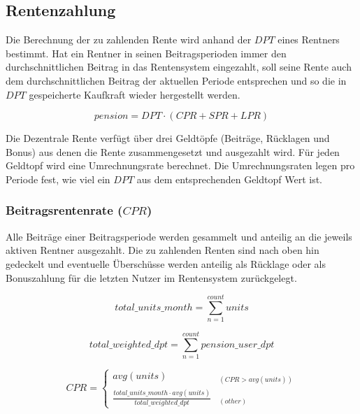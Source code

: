 \subsection{Rentenzahlung}
Die Berechnung der zu zahlenden Rente wird anhand der $DPT$ eines Rentners bestimmt.
Hat ein
Rentner in seinen Beitragsperioden immer den durchschnittlichen Beitrag in das
Rentensystem eingezahlt, soll seine
Rente auch dem durchschnittlichen Beitrag der aktuellen
Periode entsprechen und so die in $DPT$ gespeicherte Kaufkraft wieder hergestellt werden.

\begin{equation}
pension = DPT \cdot (CPR + SPR + LPR)
\end{equation}

Die Dezentrale Rente verfügt über drei Geldtöpfe (Beiträge, Rücklagen und Bonus) 
aus denen die Rente zusammengesetzt und 
ausgezahlt wird. Für jeden Geldtopf wird eine Umrechnungsrate berechnet. Die
Umrechnungsraten legen pro Periode fest, wie viel ein $DPT$ aus dem entsprechenden
Geldtopf Wert ist.

\subsubsection*{Beitragsrentenrate ($CPR$)}
Alle Beiträge einer Beitragsperiode werden gesammelt und anteilig an die jeweils
aktiven Rentner ausgezahlt.
Die zu zahlenden Renten sind nach oben hin gedeckelt und eventuelle Überschüsse werden
anteilig als Rücklage oder als Bonuszahlung für die letzten Nutzer im Rentensystem
zurückgelegt. 

\begin{equation}
	total\_units\_month = 
	\sum_{n=1}^{count} units
\end{equation}

\begin{equation}
	total\_weighted\_dpt = 
	\sum_{n=1}^{count} pension\_user\_dpt
\end{equation}


\begin{equation}
CPR = \begin{cases} 
	avg(units) & _{(CPR > avg(units))} \\
	\frac{total\_units\_month  \cdot avg(units)} 
		{total\_weighted\_dpt} & _{(other)}
\end{cases}
\end{equation}





